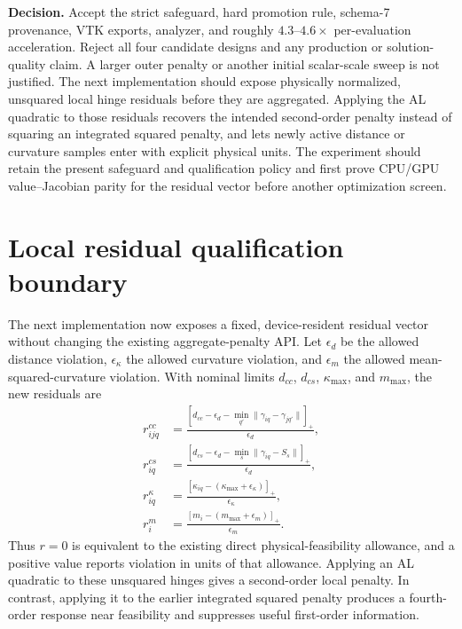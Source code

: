 \documentclass[11pt,a4paper]{article}
\begin{document}
\textbf{Decision.}  Accept the strict safeguard, hard promotion rule,
schema-7 provenance, VTK exports, analyzer, and roughly $4.3$--$4.6\times$
per-evaluation acceleration.  Reject all four candidate designs and any
production or solution-quality claim.  A larger outer penalty or another
initial scalar-scale sweep is not justified.  The next implementation should
expose physically normalized, unsquared local hinge residuals before they are
aggregated.  Applying the AL quadratic to those residuals recovers the intended
second-order penalty instead of squaring an integrated squared penalty, and
lets newly active distance or curvature samples enter with explicit physical
units.  The experiment should retain the present safeguard and qualification
policy and first prove CPU/GPU value--Jacobian parity for the residual vector
before another optimization screen.

\section{Local residual qualification boundary}

The next implementation now exposes a fixed, device-resident residual vector
without changing the existing aggregate-penalty API.  Let $\epsilon_d$ be the
allowed distance violation, $\epsilon_\kappa$ the allowed curvature violation,
and $\epsilon_m$ the allowed mean-squared-curvature violation.  With nominal
limits $d_{cc}$, $d_{cs}$, $\kappa_{\max}$, and $m_{\max}$, the new residuals are
\begin{align}
r^{cc}_{ijq} &=\frac{\left[d_{cc}-\epsilon_d-
 \min_{q'}\|\gamma_{iq}-\gamma_{jq'}\|\right]_+}{\epsilon_d},\\
r^{cs}_{iq} &=\frac{\left[d_{cs}-\epsilon_d-
 \min_s\|\gamma_{iq}-S_s\|\right]_+}{\epsilon_d},\\
r^\kappa_{iq} &=\frac{\left[\kappa_{iq}-(\kappa_{\max}
 +\epsilon_\kappa)\right]_+}{\epsilon_\kappa},\\
r^m_i &=\frac{\left[m_i-(m_{\max}+\epsilon_m)\right]_+}{\epsilon_m}.
\end{align}
Thus $r=0$ is equivalent to the existing direct physical-feasibility allowance,
and a positive value reports violation in units of that allowance.  Applying an
AL quadratic to these unsquared hinges gives a second-order local penalty.  In
contrast, applying it to the earlier integrated squared penalty produces a
fourth-order response near feasibility and suppresses useful first-order
information.
\end{document}
